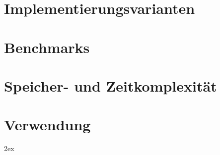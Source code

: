 \documentclass[11pt]{article}
\begin{document}
\pagebreak

\section{Implementierungsvarianten}
\pagebreak

\section{Benchmarks}
\pagebreak

\section{Speicher- und Zeitkomplexität} \label{time}
\pagebreak

\section{Verwendung}
\pagebreak

\begingroup
\parindent 0pt
\parskip 2ex
\def\enotesize{\normalsize}
\theendnotes
\endgroup 


\end{document}
